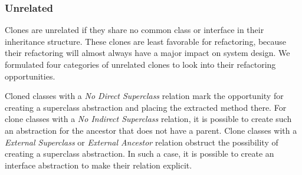 \documentclass[runningheads]{llncs}
\begin{document}
\subsubsection{Unrelated}
Clones are unrelated if they share no common class or interface in their inheritance structure. These clones are least favorable for refactoring, because their refactoring will almost always have a major impact on system design. We formulated four categories of unrelated clones to look into their refactoring opportunities.

Cloned classes with a \textit{No Direct Superclass} relation mark the opportunity for creating a superclass abstraction and placing the extracted method there. For clone classes with a \textit{No Indirect Superclass} relation, it is possible to create such an abstraction for the ancestor that does not have a parent. Clone classes with a \textit{External Superclass} or \textit{External Ancestor} relation obstruct the possibility of creating a superclass abstraction. In such a case, it is possible to create an interface abstraction to make their relation explicit.


\end{document}
